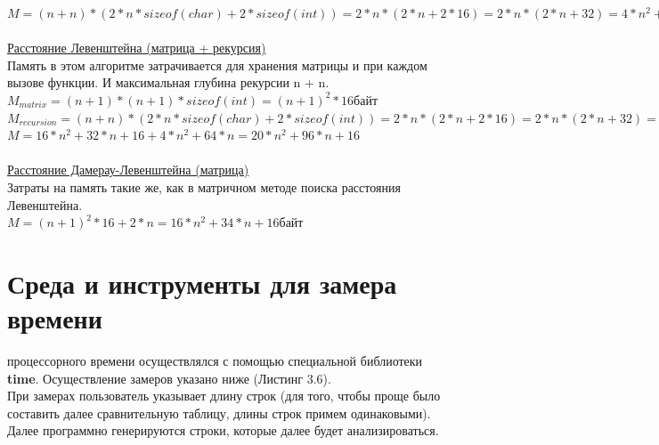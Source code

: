 \documentclass[12pt]{report}
\begin{document}
$M = (n + n) * (2 * n * sizeof(char) + 2 * sizeof(int)) = 2 * n * (2 * n + 2 * 16) = 2 * n * (2 * n + 32) = 4 * n^2 + 64 * n байт$\\
\\

\underline{Расстояние Левенштейна (матрица + рекурсия)}\\

Память в этом алгоритме затрачивается для хранения матрицы и при каждом вызове функции. И максимальная глубина рекурсии n + n.\\

$M_{matrix} = (n + 1)*(n + 1)*sizeof(int) = (n + 1)^2 * 16 байт$\\

$M_{recursion} = (n + n) * (2 * n * sizeof(char) + 2 * sizeof(int)) = 2 * n * (2 * n + 2 * 16) = 2 * n * (2 * n + 32) = 4 * n^2 + 64 * n байт$\\

$M = 16 * n^2 + 32 * n + 16 + 4 * n^2 + 64 * n = 20 * n^2 + 96 * n + 16$\\
\\

\underline{Расстояние Дамерау-Левенштейна (матрица)}\\

Затраты на память такие же, как в матричном методе поиска расстояния Левенштейна.\\

$M = (n + 1)^2 * 16 + 2*n = 16 * n^2 + 34 * n + 16 байт$\\

\newpage\section{Среда и инструменты для замера времени}
 процессорного времени осуществлялся с помощью специальной библиотеки \textbf{time}. Осуществление замеров указано ниже (Листинг 3.6). \\

При замерах пользователь указывает длину строк (для того, чтобы проще было составить далее сравнительную таблицу, длины строк примем одинаковыми). Далее программно генерируются строки, которые далее будет анализироваться.\\
\end{document}
